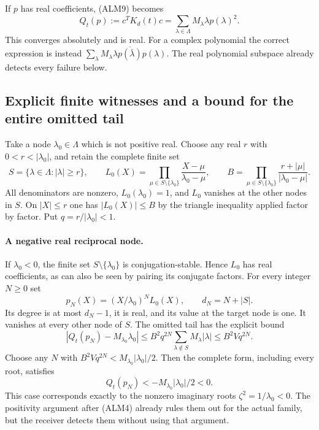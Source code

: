If $p$ has real coefficients, (ALM9) becomes
\begin{equation}\tag{ALM11}
 Q_t(p):=c^TK_d(t)c
       =\sum_{\lambda\in\Lambda}M_\lambda\lambda p(\lambda)^2.
\end{equation}
This converges absolutely and is real. For a complex polynomial the
correct expression is instead
$\sum_\lambda M_\lambda\lambda\overline{p(\bar\lambda)}p(\lambda)$.
The real polynomial subspace already detects every failure below.

\subsection{Explicit finite witnesses and a bound for the entire omitted tail}

Take a node $\lambda_0\in\Lambda$ which is not positive real. Choose
any real $r$ with $0<r<|\lambda_0|$, and retain the complete finite set
\begin{equation}\tag{ALM12}
 S=\{\lambda\in\Lambda:|\lambda|\ge r\},\qquad
 L_0(X)=\prod_{\mu\in S\setminus\{\lambda_0\}}
                    \frac{X-\mu}{\lambda_0-\mu},\qquad
 B=\prod_{\mu\in S\setminus\{\lambda_0\}}
                    \frac{r+|\mu|}{|\lambda_0-\mu|}.
\end{equation}
All denominators are nonzero, $L_0(\lambda_0)=1$, and $L_0$ vanishes
at the other nodes in $S$. On $|X|\le r$ one has $|L_0(X)|\le B$ by
the triangle inequality applied factor by factor. Put $q=r/|\lambda_0|<1$.

\paragraph{A negative real reciprocal node.}
If $\lambda_0<0$, the finite set $S\setminus\{\lambda_0\}$ is
conjugation-stable. Hence $L_0$ has real coefficients, as can also be
seen by pairing its conjugate factors. For every integer $N\ge0$ set
\begin{equation}\tag{ALM13}
 p_N(X)=(X/\lambda_0)^N L_0(X),\qquad
 d_N=N+|S|.
\end{equation}
Its degree is at most $d_N-1$, it is real, and its value at the target
node is one. It vanishes at every other node of $S$. The omitted tail
has the explicit bound
\begin{equation}\tag{ALM14}
 \left|Q_t(p_N)-M_{\lambda_0}\lambda_0\right|
 \le B^2q^{2N}\sum_{\lambda\notin S}M_\lambda|\lambda|
 \le B^2Vq^{2N}.
\end{equation}
Choose any $N$ with $B^2Vq^{2N}<M_{\lambda_0}|\lambda_0|/2$.
Then the complete form, including every root, satisfies
\begin{equation}\tag{ALM15}
 Q_t(p_N)<-M_{\lambda_0}|\lambda_0|/2<0.
\end{equation}
This case corresponds exactly to the nonzero imaginary roots
$\zeta^2=1/\lambda_0<0$. The positivity argument after (ALM4) already
rules them out for the actual family, but the receiver detects them
without using that argument.


